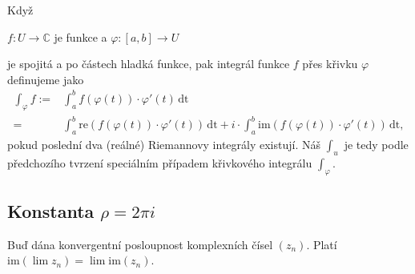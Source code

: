 \documentclass[../main.tex]{subfiles}
\begin{document}
\begin{definition}
    Když
    \begin{center}
        $f:U\to\mathbb{C}$ je funkce a $\varphi:[a,b]\to U$
    \end{center}
    je spojitá a po částech hladká funkce, pak integrál funkce $f$
    přes křivku $\varphi$ definujeme jako
    \begin{align*}
        \int_{\varphi} f :=& \int_a^b f(\varphi(t))\cdot\varphi'(t)\,\text{dt}\\
        =& \int_a^b \text{re}\left(f\left(\varphi\left(t\right)\right)\cdot\varphi'\left(t\right)\right)\,\text{dt}
        + i \cdot \int_a^b \text{im}\left(f\left(\varphi\left(t\right)\right)\cdot\varphi'\left(t\right)\right)\,\text{dt},
    \end{align*}
    pokud poslední dva (reálné) Riemannovy integrály existují. Náš  $\int_u$ je tedy podle
    předchozího tvrzení speciálním případem křivkového integrálu $\int_\varphi$.
\end{definition}

\subsection{Konstanta \texorpdfstring{$\rho = 2\pi i$}{Lg}}

\begin{lemma}
    Buď dána konvergentní posloupnost komplexních čísel $(z_n)$. Platí $\text{im}(\lim z_n) = \lim \text{im}(z_n)$.
\end{lemma}
\end{document}
